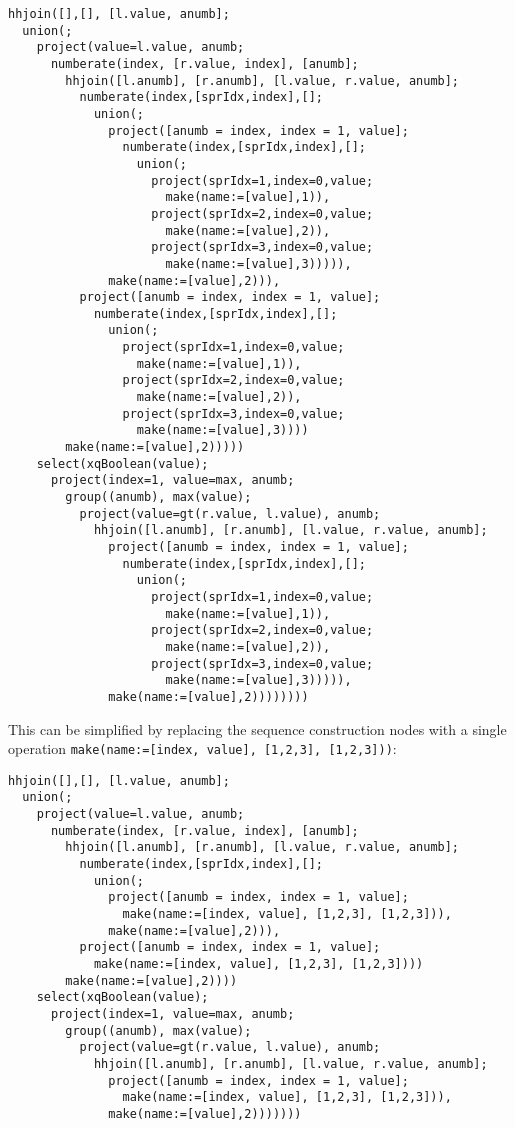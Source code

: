 \begin{Verbatim}
hhjoin([],[], [l.value, anumb];
  union(;
    project(value=l.value, anumb;
      numberate(index, [r.value, index], [anumb];
        hhjoin([l.anumb], [r.anumb], [l.value, r.value, anumb];
          numberate(index,[sprIdx,index],[];
            union(;
              project([anumb = index, index = 1, value];
                numberate(index,[sprIdx,index],[];
                  union(;
                    project(sprIdx=1,index=0,value;
                      make(name:=[value],1)),
                    project(sprIdx=2,index=0,value;
                      make(name:=[value],2)),
                    project(sprIdx=3,index=0,value;
                      make(name:=[value],3))))),
              make(name:=[value],2))),
          project([anumb = index, index = 1, value];
            numberate(index,[sprIdx,index],[];
              union(;
                project(sprIdx=1,index=0,value;
                  make(name:=[value],1)),
                project(sprIdx=2,index=0,value;
                  make(name:=[value],2)),
                project(sprIdx=3,index=0,value;
                  make(name:=[value],3))))
        make(name:=[value],2)))))
    select(xqBoolean(value);
      project(index=1, value=max, anumb;
        group((anumb), max(value);
          project(value=gt(r.value, l.value), anumb;
            hhjoin([l.anumb], [r.anumb], [l.value, r.value, anumb];
              project([anumb = index, index = 1, value];
                numberate(index,[sprIdx,index],[];
                  union(;
                    project(sprIdx=1,index=0,value;
                      make(name:=[value],1)),
                    project(sprIdx=2,index=0,value;
                      make(name:=[value],2)),
                    project(sprIdx=3,index=0,value;
                      make(name:=[value],3))))),
              make(name:=[value],2))))))))
\end{Verbatim}
 
This can be simplified by replacing the sequence construction nodes with a
single operation \texttt{make(name:=[index, value], [1,2,3], [1,2,3]))}:

\begin{Verbatim}
hhjoin([],[], [l.value, anumb];
  union(;
    project(value=l.value, anumb;
      numberate(index, [r.value, index], [anumb];
        hhjoin([l.anumb], [r.anumb], [l.value, r.value, anumb];
          numberate(index,[sprIdx,index],[];
            union(;
              project([anumb = index, index = 1, value];
                make(name:=[index, value], [1,2,3], [1,2,3])),
              make(name:=[value],2))),
          project([anumb = index, index = 1, value];
            make(name:=[index, value], [1,2,3], [1,2,3])))
        make(name:=[value],2))))
    select(xqBoolean(value);
      project(index=1, value=max, anumb;
        group((anumb), max(value);
          project(value=gt(r.value, l.value), anumb;
            hhjoin([l.anumb], [r.anumb], [l.value, r.value, anumb];
              project([anumb = index, index = 1, value];
                make(name:=[index, value], [1,2,3], [1,2,3])),
              make(name:=[value],2)))))))
\end{Verbatim}
